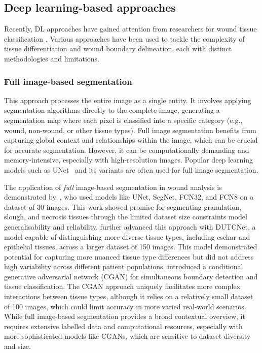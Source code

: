 \subsection{Deep learning-based approaches}
Recently, DL approaches have gained attention from researchers for wound tissue classification \citep{MARTIN2024}. Various approaches have been used to tackle the complexity of tissue differentiation and wound boundary delineation, each with distinct methodologies and limitations.

\subsubsection{Full image-based segmentation} 
This approach processes the entire image as a single entity. It involves applying segmentation algorithms directly to the complete image, generating a segmentation map where each pixel is classified into a specific category (e.g., wound, non-wound, or other tissue types). Full image segmentation benefits from capturing global context and relationships within the image, which can be crucial for accurate segmentation. However, it can be computationally demanding and memory-intensive, especially with high-resolution images. Popular deep learning models such as UNet~\citep{RW17ronneberger2015u} and its variants are often used for full image segmentation.

The application of \textit{full} image-based segmentation in wound analysis is demonstrated by~\citet{RW37godeiro2018chronic}, who used models like UNet, SegNet, FCN32, and FCN8 on a dataset of 30 images. This work showed promise for segmenting granulation, slough, and necrosis tissues through the limited dataset size constraints model generalisability and reliability. \citet{RAJATHI2024105855} further advanced this approach with DUTCNet, a model capable of distinguishing more diverse tissue types, including eschar and epithelial tissues, across a larger dataset of 150 images. This model demonstrated potential for capturing more nuanced tissue type differences but did not address high variability across different patient populations.
\citet{RW38sarp2021simultaneous} introduced a conditional generative adversarial network (CGAN) for simultaneous boundary detection and tissue classification. The CGAN approach uniquely facilitates more complex interactions between tissue types, although it relies on a relatively small dataset of 100 images, which could limit accuracy in more varied real-world scenarios. While full image-based segmentation provides a broad contextual overview, it requires extensive labelled data and computational resources, especially with more sophisticated models like CGANs, which are sensitive to dataset diversity and size.

